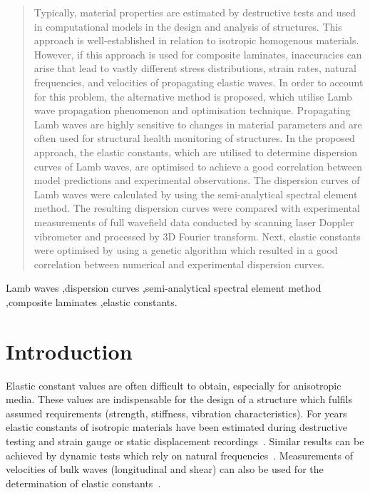 \documentclass[preprint,12pt]{elsarticle}
\providecommand{\DIFaddend}{} %
\begin{document}
\begin{frontmatter}
		\DIFaddend \begin{abstract}
		Typically, material properties are estimated by destructive tests and used in computational models in the design and analysis  of structures. This approach is well-established in relation to isotropic homogenous materials. However, if this approach is used for composite laminates, inaccuracies can arise that lead to vastly different stress distributions, strain rates, natural frequencies, and velocities of propagating elastic waves. In order to account for this problem, the alternative method is proposed, which utilise Lamb wave propagation phenomenon and optimisation technique. Propagating Lamb waves are highly sensitive to changes in material parameters and are often used for structural health monitoring of structures. In the proposed approach, the elastic constants, which are utilised to determine dispersion curves of Lamb waves, are optimised to achieve a good correlation between model predictions and experimental observations. The dispersion curves of Lamb waves were calculated by using the semi-analytical spectral element method. The resulting dispersion curves were compared with experimental measurements of full wavefield data conducted by scanning laser Doppler vibrometer and processed by 3D Fourier transform. Next, elastic constants were optimised by using a genetic algorithm which resulted in a good correlation between numerical and experimental dispersion curves.
		\end{abstract}

		\begin{keyword}
			Lamb waves \sep dispersion curves \sep semi-analytical spectral element method \sep composite laminates \sep elastic constants.


		\end{keyword}

	\end{frontmatter}


	\section{Introduction}
	Elastic constant values are often difficult to obtain, especially for anisotropic media. These values are indispensable for the design of a structure which fulfils assumed requirements (strength, stiffness, vibration characteristics). For years elastic constants of isotropic materials have been estimated during destructive testing and strain gauge or static displacement recordings~\cite{Wang2000}. Similar results can be achieved by dynamic tests which rely on natural frequencies~\cite{Wang2000a, Wesolowski2009,Beluch2014}. Measurements of velocities of bulk waves (longitudinal and shear) can also be used for the determination of elastic constants~\cite{Rose1999}.
\end{document}
